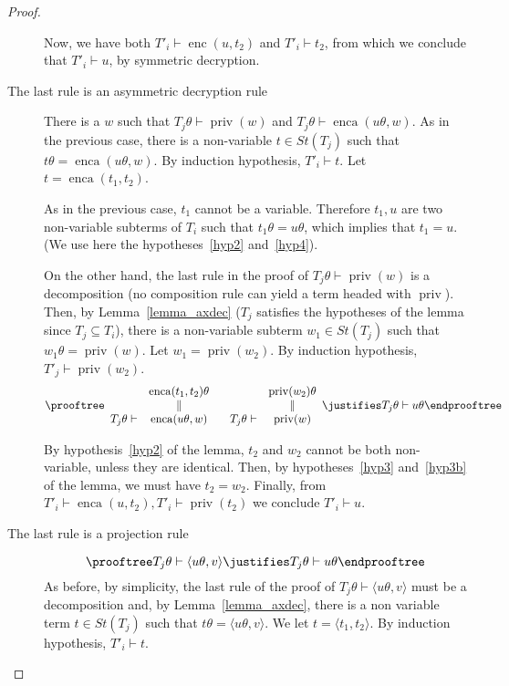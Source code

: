 \documentclass[acmtocl,acmnow]{acmtrans2m}
\newcommand{\pair}[2]{\langle{#1},{#2}\rangle}
\newcommand{\st}{\mathit{St}}
\newcommand{\enc}{\operatorname{enc}}
\newcommand{\enca}{\operatorname{enca}}
\newcommand{\pub}[1]{#1}
\newcommand{\priv}{\operatorname{priv}}
\begin{document}
\begin{proof}
\begin{description}
Now, we have both $T'_i \vdash \enc(u,t_2)$  and $T'_i \vdash t_2$, from which
we conclude that $T'_i \vdash u$, by symmetric decryption.

\item[The last rule is an asymmetric decryption rule]
There is a $w$ such that  $T_j\theta \vdash \priv(w)$ and $T_j\theta \vdash \enca(u\theta,\pub{w})$.  As in the previous case, there is a non-variable
$t\in \st(T_j)$ such that $t\theta = \enca(u\theta,\pub{w})$. 
By induction hypothesis, $T'_i \vdash t$.
Let $t = \enca(t_1,t_2)$.


As in the previous case, $t_1$ cannot be a variable. Therefore $t_1,u$ are
two non-variable subterms of $T_i$ such that $t_1\theta = u\theta$, which
implies that $t_1=u$. (We use here the hypotheses~\ref{hyp2} and~\ref{hyp4}). 

On the other hand, the
last rule in the proof of $T_j\theta \vdash \priv(w)$ is a decomposition
(no composition rule can yield a term headed with $\priv$). Then, by
Lemma~\ref{lemma_axdec} ($T_j$ satisfies the hypotheses of the lemma since
$T_j\subseteq T_i$),  there is a non-variable subterm $w_1\in \st(T_j)$ such
that $w_1\theta = \priv(w)$. Let $w_1=\priv(w_2)$.
By induction hypothesis, $T'_j \vdash \priv(w_2)$.
\[
\prooftree
\begin{array}{rc}
& \enca(t_1,t_2)\theta\\
& \|\\
T_j\theta \vdash & \enca(u\theta,w)
\end{array}\;\;
\;\begin{array}{rc}
& \priv(w_2)\theta\\
& \| \\
T_j\theta \vdash & \priv(w)
\end{array}
\justifies T_j\theta \vdash u\theta
\endprooftree
\]

By hypothesis~\ref{hyp2} of the lemma, $t_2$ and $w_2$ cannot be both non-variable, unless they are identical. 
Then, by hypotheses~\ref{hyp3} and~\ref{hyp3b} of the lemma, 
we must have $t_2=w_2$. Finally, from $T'_i \vdash \enca(u,t_2), T'_i \vdash \priv(t_2)$ we conclude $T'_i \vdash u$. 

\item[The last rule is a projection rule]
\[
\prooftree
T_j\theta\vdash \pair{u\theta}{v}
\justifies T_j\theta \vdash  u\theta
\endprooftree
\]
As before, by simplicity,
the last rule of the proof of $T_j\theta \vdash \pair{u\theta}{v}$
must be a decomposition and, by Lemma~\ref{lemma_axdec}, there is a non variable
term
$t\in \st(T_j)$ such that $t\theta= \pair{u\theta}{v}$. We let $t = \pair{t_1}{t_2}$. By induction hypothesis, $T'_i \vdash t$.


\end{description}
\end{proof}
\end{document}
